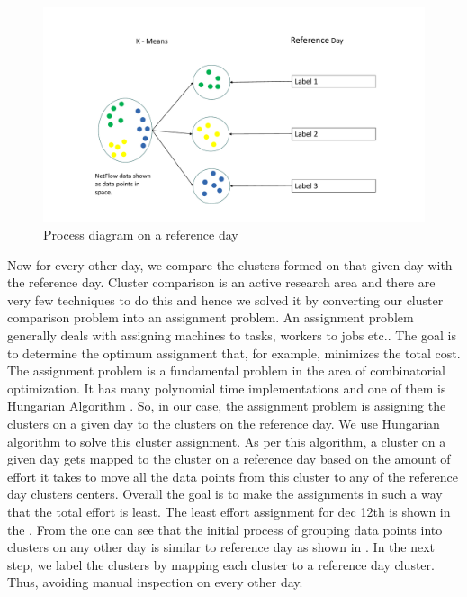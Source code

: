 \begin{figure}[b]
	\centerline{\includegraphics[scale = 0.5]{cluster_comp.pdf}}
	\caption{Process diagram on a reference day}%
\end{figure}

 Now for every other day, we compare the clusters formed on that given day with the reference day. Cluster comparison is an active research area and there are very few techniques to do this and hence we solved it by converting our cluster comparison problem into an assignment problem. An assignment problem generally deals with assigning machines to tasks, workers to jobs etc.. The goal is to determine the optimum assignment that, for example, minimizes the total cost. The assignment problem is a fundamental problem in the area of combinatorial optimization. It has many polynomial time implementations and one of them is Hungarian Algorithm \cite{kuhn1955hungarian}. So, in our case, the assignment problem is assigning the clusters on a given day to the clusters on the reference day. We use Hungarian algorithm to solve this cluster assignment. As per this algorithm, a cluster on a given day gets mapped to the cluster on a reference day based on the amount of effort it takes to move all the data points from this cluster to any of the reference day clusters centers. Overall the goal is to make the assignments in such a way that the total effort is least. The least effort assignment for dec 12th is shown in the . From the   one can see that the initial process of grouping data points into clusters on any other day is similar to reference day as shown in . In the next step, we label the clusters by mapping each cluster to a reference day cluster. Thus, avoiding manual inspection on every other day.
 
